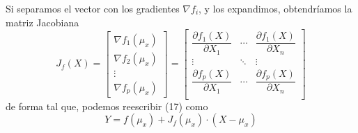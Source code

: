 \documentclass[a4paper, 10pt]{article}
\begin{document}
Si separamos el vector con los gradientes $\nabla f_i$, y los expandimos, obtendríamos la matriz Jacobiana
\begin{equation}
    J_f(X) = \begin{bmatrix}
        \nabla f_1\left(\mu_x\right) \\
        \nabla f_2\left(\mu_x\right) \\
        \vdots                       \\
        \nabla f_p\left(\mu_x\right)
    \end{bmatrix} = \begin{bmatrix}
        \dfrac{\partial f_1(X)}{\partial X_1} & \cdots & \dfrac{\partial f_1(X)}{\partial X_n} \\
        \vdots                                & \ddots & \vdots                                \\
        \dfrac{\partial f_p(X)}{\partial X_1} & \cdots & \dfrac{\partial f_p(X)}{\partial X_n} \\
    \end{bmatrix}
\end{equation}
de forma tal que, podemos reescribir (17) como
\begin{equation}
    Y = f(\mu_x) + J_f(\mu_x)\cdot (X-\mu_x)
\end{equation}
\end{document}
